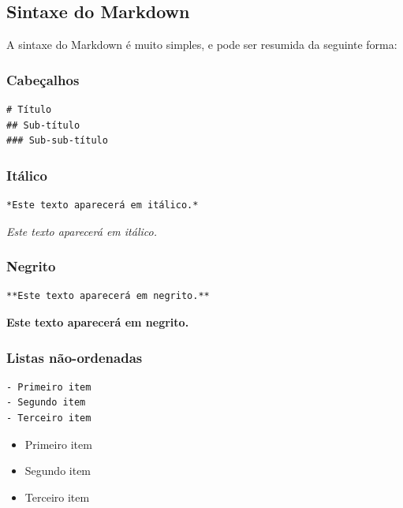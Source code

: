 \documentclass[10pt,a4paper]{book}
\providecommand{\tightlist}{%
  \setlength{\itemsep}{0pt}\setlength{\parskip}{0pt}}
\begin{document}
\subsection{Sintaxe do Markdown}\label{sintaxe-do-markdown}

A sintaxe do Markdown é muito simples, e pode ser resumida da seguinte
forma:

\subsubsection*{Cabeçalhos}\label{cabeuxe7alhos}


\begin{verbatim}
# Título
## Sub-título
### Sub-sub-título
\end{verbatim}

\subsubsection*{Itálico}\label{ituxe1lico}


\begin{verbatim}
*Este texto aparecerá em itálico.*
\end{verbatim}

\emph{Este texto aparecerá em itálico.}

\subsubsection*{Negrito}\label{negrito}


\begin{verbatim}
**Este texto aparecerá em negrito.**
\end{verbatim}

\textbf{Este texto aparecerá em negrito.}

\subsubsection*{Listas não-ordenadas}\label{listas-nuxe3o-ordenadas}


\begin{verbatim}
- Primeiro item
- Segundo item
- Terceiro item
\end{verbatim}

\begin{itemize}
\tightlist
\item
  Primeiro item
\item
  Segundo item
\item
  Terceiro item
\end{itemize}
\end{document}
